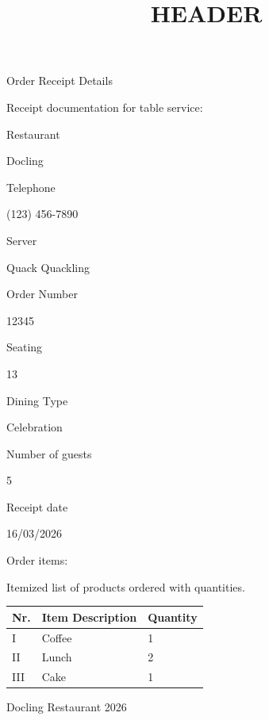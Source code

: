 \documentclass[11pt,a4paper]{article}
\title{HEADER}
\begin{document}
\maketitle

Order Receipt Details

Receipt documentation for table service:

Restaurant

Docling

Telephone

(123) 456-7890

Server

Quack Quackling

Order Number

12345

Seating

13

Dining Type

Celebration

Number of guests

5

Receipt date

16/03/2026

Order items:

Itemized list of products ordered with quantities.

\begin{table}[h]
\begin{tabular}{|l|l|l|}
\hline
Nr. & Item Description & Quantity \\ \hline
I & Coffee & 1 \\ \hline
II & Lunch & 2 \\ \hline
III & Cake & 1 \\ \hline
\end{tabular}
\end{table}

Docling Restaurant 2026
\end{document}
